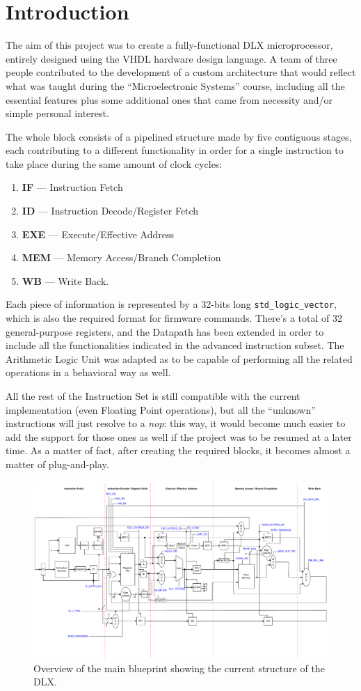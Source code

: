 \chapter{Introduction}
\label{intro}

The aim of this project was to create a fully-functional DLX microprocessor, entirely designed using the VHDL hardware design language. A team of three people contributed to the development of a custom architecture that would reflect what was taught during the ``Microelectronic Systems'' course, including all the essential features plus some additional ones that came from necessity and/or simple personal interest.

The whole block consists of a pipelined structure made by five contiguous stages, each contributing to a different functionality in order for a single instruction to take place during the same amount of clock cycles:
\begin{enumerate}
\item \textbf{IF} — Instruction Fetch
\item \textbf{ID} — Instruction Decode/Register Fetch
\item \textbf{EXE} — Execute/Effective Address
\item \textbf{MEM} — Memory Access/Branch Completion
\item \textbf{WB} — Write Back.
\end{enumerate}

Each piece of information is represented by a 32-bits long \texttt{std\_logic\_vector}, which is also the required format for firmware commands. There's a total of 32 general-purpose registers, and the Datapath has been extended in order to include all the functionalities indicated in the advanced instruction subset. The Arithmetic Logic Unit was adapted as to be capable of performing all the related operations in a behavioral way as well.

All the rest of the Instruction Set is still compatible with the current implementation (even Floating Point operations), but all the ``unknown'' instructions will just resolve to a \emph{nop}: this way, it would become much easier to add the support for those ones as well if the project was to be resumed at a later time. As a matter of fact, after creating the required blocks, it becomes almost a matter of plug-and-play.

\begin{figure}[!ht]
\centering
\includegraphics[width=\textwidth]{./chapters/figures/datapath.pdf} 
\caption{Overview of the main blueprint showing the current structure of the DLX.}
\end{figure}